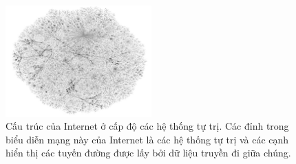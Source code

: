 \begin{figure}[ht]
\centering
\includegraphics[width=0.5\textwidth]{res/h23.png}
\caption{Cấu trúc của Internet ở cấp độ các hệ thống tự trị. Các đỉnh trong biểu diễn mạng này của Internet là các hệ thống tự trị và các cạnh hiển thị các tuyến đường được lấy bởi dữ liệu truyền đi giữa chúng.}
\label{fig:h23}
\end{figure}
